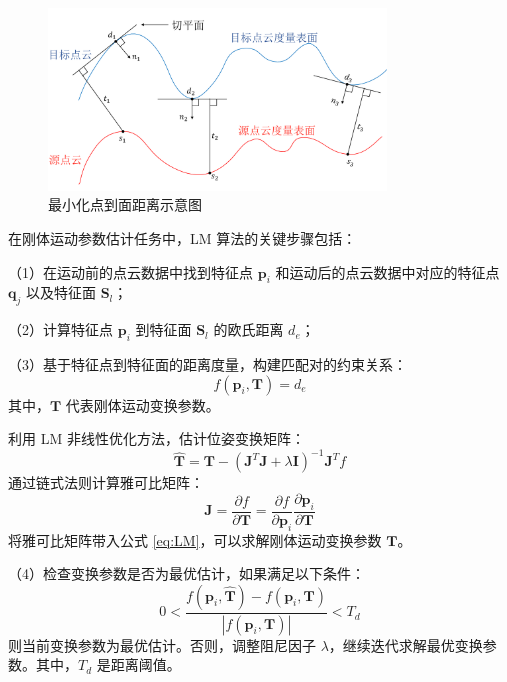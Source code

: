 \begin{figure}[htbp]
    \centering
    \vspace{-0.5cm}
    \includegraphics[width=0.8\textwidth]{images/LM_point2plane.pdf}
    \caption{最小化点到面距离示意图}
    \label{fig:point2plane} 
    \vspace{-1.5cm}
\end{figure}

在刚体运动参数估计任务中，LM 算法的关键步骤包括：

（1）在运动前的点云数据中找到特征点 $\boldsymbol{p}_i$ 和运动后的点云数据中对应的特征点 $\boldsymbol{q}_j$ 以及特征面 $\boldsymbol{S}_l$；

（2）计算特征点 $\boldsymbol{p}_i$ 到特征面 $\boldsymbol{S}_l$ 的欧氏距离 $d_e$；

（3）基于特征点到特征面的距离度量，构建匹配对的约束关系：
\begin{equation}
f(\boldsymbol{p}_i, \boldsymbol{T}) = d_e
\end{equation}
其中，$\boldsymbol{T}$ 代表刚体运动变换参数。

利用 LM 非线性优化方法，估计位姿变换矩阵：
\begin{equation}
\hat{\boldsymbol{T}} = \boldsymbol{T} - (\boldsymbol{J}^T \boldsymbol{J} + \lambda \boldsymbol{I})^{-1} \boldsymbol{J}^T f
\label{eq:LM}
\end{equation}
通过链式法则计算雅可比矩阵：
\begin{equation}
\boldsymbol{J} = \frac{\partial f}{\partial \boldsymbol{T}} = \frac{\partial f}{\partial \boldsymbol{p}_i} \frac{\partial \boldsymbol{p}_i}{\partial \boldsymbol{T}}
\end{equation}
将雅可比矩阵带入公式 \ref{eq:LM}，可以求解刚体运动变换参数 $\boldsymbol{T}$。

（4）检查变换参数是否为最优估计，如果满足以下条件：
\begin{equation}
0 < \frac{f(\boldsymbol{p}_i, \hat{\boldsymbol{T}}) - f(\boldsymbol{p}_i, \boldsymbol{T})}{|f(\boldsymbol{p}_i, \boldsymbol{T})|} < T_d
\end{equation}
则当前变换参数为最优估计。否则，调整阻尼因子 $\lambda$，继续迭代求解最优变换参数。其中，$T_d$ 是距离阈值。

